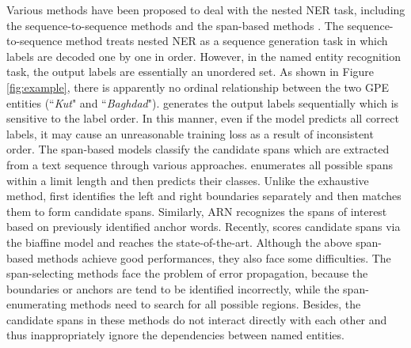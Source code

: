 \documentclass{article}
\begin{document}
Various methods have been proposed to deal with the nested NER task, including
the sequence-to-sequence methods \cite{ju2018neural,strakova2019neural,jue2020pyramid} and the span-based methods \cite{sohrab2018deep,zheng2019boundary,yu2020named}. The sequence-to-sequence method treats nested NER as a sequence generation task in which labels are decoded one by one in order. However, in the named entity recognition task, the output labels are essentially an unordered set. As shown in Figure \ref{fig:example}, there is apparently no ordinal relationship between the two GPE entities (``\textit{Kut}" and ``\textit{Baghdad}"). \citep{strakova2019neural} generates the output labels sequentially which is sensitive to the label order. In this manner, even if the model predicts all correct labels, it may cause an unreasonable training loss as a result of inconsistent order.
The span-based models classify the candidate spans which are extracted from a text sequence through various approaches. 
\citep{sohrab2018deep} enumerates all possible spans within a limit length and then predicts their classes. Unlike the exhaustive method, \citep{zheng2019boundary} first identifies the left and right boundaries separately and then matches them to form candidate spans. Similarly, ARN \cite{lin2019sequence} recognizes the spans of interest based on previously identified anchor words. Recently, \citep{yu2020named} scores candidate spans via the biaffine model \cite{DBLP:journals/corr/DozatM16} and  reaches the state-of-the-art. Although the above span-based methods achieve good performances, they also face some difficulties. The span-selecting methods face the problem of error propagation, because the boundaries or anchors are tend to be identified incorrectly, while the span-enumerating methods need to search for all possible regions. Besides, the candidate spans in these methods do not interact directly with each other and thus inappropriately ignore the dependencies between named entities.
\end{document}
